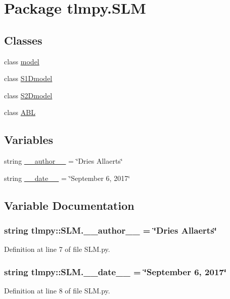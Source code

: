 \hypertarget{namespacetlmpy_1_1SLM}{
\section{Package tlmpy.SLM}
\label{namespacetlmpy_1_1SLM}
}
\subsection*{Classes}
\begin{DoxyCompactItemize}
\item 
class \hyperlink{classtlmpy_1_1SLM_1_1model}{model}
\item 
class \hyperlink{classtlmpy_1_1SLM_1_1S1Dmodel}{S1Dmodel}
\item 
class \hyperlink{classtlmpy_1_1SLM_1_1S2Dmodel}{S2Dmodel}
\item 
class \hyperlink{classtlmpy_1_1SLM_1_1ABL}{ABL}
\end{DoxyCompactItemize}
\subsection*{Variables}
\begin{DoxyCompactItemize}
\item 
string \hyperlink{namespacetlmpy_1_1SLM_a157de5410f030d37bd7dcae190df95cc}{\_\-\_\-author\_\-\_\-} = \char`\"{}Dries Allaerts\char`\"{}
\item 
string \hyperlink{namespacetlmpy_1_1SLM_a1cf578b9a7104484977da64dd882bfd2}{\_\-\_\-date\_\-\_\-} = \char`\"{}September 6, 2017\char`\"{}
\end{DoxyCompactItemize}


\subsection{Variable Documentation}
\hypertarget{namespacetlmpy_1_1SLM_a157de5410f030d37bd7dcae190df95cc}{
\subsubsection[{\_\-\_\-author\_\-\_\-}]{\setlength{\rightskip}{0pt plus 5cm}string {\bf tlmpy::SLM.\_\-\_\-author\_\-\_\-} = \char`\"{}Dries Allaerts\char`\"{}}}
\label{namespacetlmpy_1_1SLM_a157de5410f030d37bd7dcae190df95cc}


Definition at line 7 of file SLM.py.\hypertarget{namespacetlmpy_1_1SLM_a1cf578b9a7104484977da64dd882bfd2}{
\subsubsection[{\_\-\_\-date\_\-\_\-}]{\setlength{\rightskip}{0pt plus 5cm}string {\bf tlmpy::SLM.\_\-\_\-date\_\-\_\-} = \char`\"{}September 6, 2017\char`\"{}}}
\label{namespacetlmpy_1_1SLM_a1cf578b9a7104484977da64dd882bfd2}


Definition at line 8 of file SLM.py.